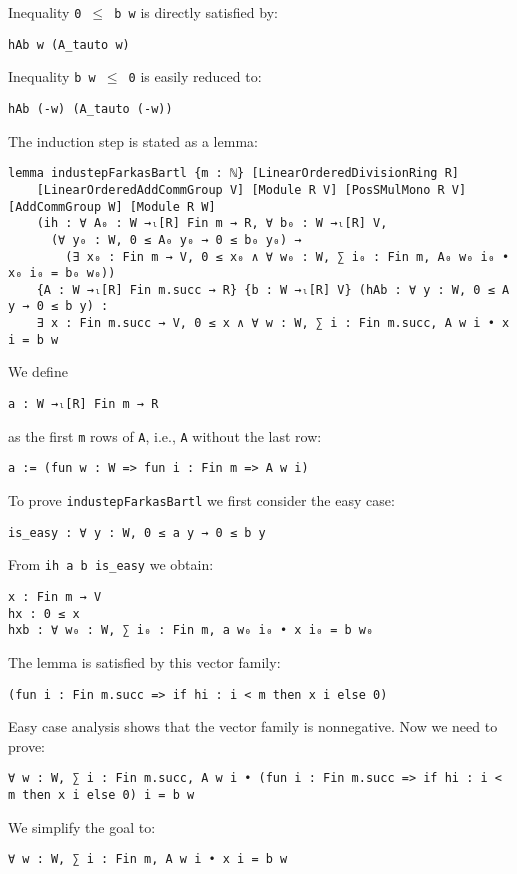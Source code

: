 \documentclass[]{article}
\renewcommand{\.}{\hskip .75pt}
\begin{document}
Inequality \texttt{0 $\le$ b w} is directly satisfied by:
\begin{lstlisting}
hAb w (A_tauto w)
\end{lstlisting}
Inequality \texttt{b w $\le$ 0} is easily reduced to:
\begin{lstlisting}
hAb (-w) (A_tauto (-w))
\end{lstlisting}
The induction step is stated as a lemma:
\begin{lstlisting}
lemma industepFarkasBartl {m : ℕ} [LinearOrderedDivisionRing R]
    [LinearOrderedAddCommGroup V] [Module R V] [PosSMulMono R V] [AddCommGroup W] [Module R W]
    (ih : ∀ A₀ : W →ₗ[R] Fin m → R, ∀ b₀ : W →ₗ[R] V,
      (∀ y₀ : W, 0 ≤ A₀ y₀ → 0 ≤ b₀ y₀) →
        (∃ x₀ : Fin m → V, 0 ≤ x₀ ∧ ∀ w₀ : W, ∑ i₀ : Fin m, A₀ w₀ i₀ • x₀ i₀ = b₀ w₀))
    {A : W →ₗ[R] Fin m.succ → R} {b : W →ₗ[R] V} (hAb : ∀ y : W, 0 ≤ A y → 0 ≤ b y) :
    ∃ x : Fin m.succ → V, 0 ≤ x ∧ ∀ w : W, ∑ i : Fin m.succ, A w i • x i = b w
\end{lstlisting}
We define
\begin{lstlisting}
a : W →ₗ[R] Fin m → R
\end{lstlisting}
as the first \texttt{m} rows of \texttt{A}, i.e., \texttt{A} without the last row:
\begin{lstlisting}
a := (fun w : W => fun i : Fin m => A w i)
\end{lstlisting}
To prove \texttt{industepFarkasBartl} we first consider the easy case:
\begin{lstlisting}
is_easy : ∀ y : W, 0 ≤ a y → 0 ≤ b y
\end{lstlisting}
From \texttt{ih a b is\_easy} we obtain:
\begin{lstlisting}
x : Fin m → V
hx : 0 ≤ x
hxb : ∀ w₀ : W, ∑ i₀ : Fin m, a w₀ i₀ • x i₀ = b w₀
\end{lstlisting}
The lemma is satisfied by this vector family:
\begin{lstlisting}
(fun i : Fin m.succ => if hi : i < m then x i else 0)
\end{lstlisting}
Easy case analysis shows that the vector family is nonnegative.
Now we need to prove:
\begin{lstlisting}
∀ w : W, ∑ i : Fin m.succ, A w i • (fun i : Fin m.succ => if hi : i < m then x i else 0) i = b w
\end{lstlisting}
We simplify the goal to:
\begin{lstlisting}
∀ w : W, ∑ i : Fin m, A w i • x i = b w
\end{lstlisting}
\end{document}
